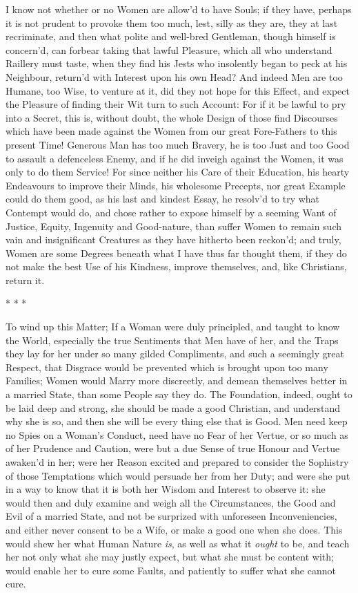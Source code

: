 I know not whether or no Women are allow'd to have Souls; if they
have, perhaps it is not prudent to provoke them too much, lest, silly
as they are, they at last recriminate, and then what polite and
well-bred Gentleman, though himself is concern'd, can forbear taking
that lawful Pleasure, which all who understand Raillery must taste,
when they find his Jests who insolently began to peck at his
Neighbour, return'd with Interest upon his own Head? And indeed Men
are too Humane, too Wise, to venture at it, did they not hope for this
Effect, and expect the Pleasure of finding their Wit turn to such
Account: For if it be lawful to pry into a Secret,  this is,
without doubt, the whole Design of those find Discourses which have
been made against the Women from our great Fore-Fathers to this
present Time! Generous Man has too much Bravery, he is too Just and
too Good to assault a defenceless Enemy, and if he did inveigh against
the Women, it was only to do them Service! For since neither his Care
of their Education, his hearty Endeavours to improve their Minds, his
wholesome Precepts, nor great Example could do them good, as his
last and kindest Essay, he resolv'd to try what Contempt would do, and
chose rather to expose himself by a seeming Want of Justice, Equity,
Ingenuity and Good-nature, than suffer Women to remain such vain and
insignificant Creatures as they have hitherto been reckon'd; and
truly, Women are some Degrees beneath what I have thus far thought
them, if they do not make the best Use of his Kindness, improve
themselves, and, like Christians, return it.

\begin{center}* * *\end{center}

To wind up this Matter; If a Woman were duly principled, and
taught to know the World, especially the true Sentiments that Men have
of her, and the Traps they lay for her under so many gilded
Compliments, and such a  seemingly great Respect, that
Disgrace would be prevented which is brought upon too many Families;
Women would Marry more discreetly, and demean themselves better in a
married State, than some People say they do. The Foundation, indeed,
ought to be laid deep and strong, she should be made a good Christian,
and understand why she is so, and then she will be every thing else
that is Good. Men need keep no Spies on a Woman's Conduct, need have
no Fear of her Vertue, or so much as of her Prudence and Caution, were
but a due Sense of true Honour and Vertue awaken'd in her; were her
Reason excited and prepared to consider the Sophistry of those
Temptations which would persuade her from her Duty; and were she put
in a way to know that it is both her Wisdom and Interest to observe
it: she would then and duly examine and weigh all the Circumstances,
the Good and Evil of a married State, and not be surprized with
unforeseen Inconveniencies, and either never consent to be a Wife, or
 make a good one when she does. This would shew her what
Human Nature \textit{is}, as well as what it \textit{ought} to be, and
teach her not only what she may justly expect, but what she must be
content with; would enable her to cure some Faults, and patiently to
suffer what she cannot cure.

